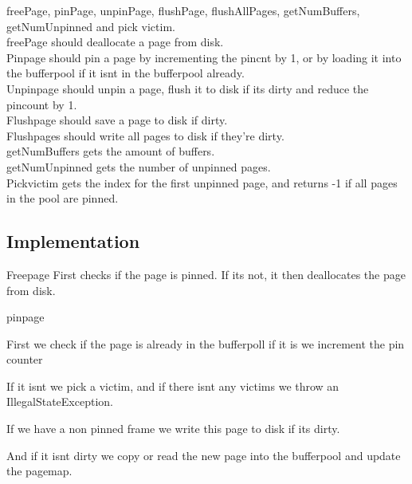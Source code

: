 \documentclass[a4paper,10pt,titlepage]{report}
\begin{document}
freePage, pinPage, unpinPage, flushPage, flushAllPages, getNumBuffers, getNumUnpinned and pick victim. \\

freePage should deallocate a page from disk.\\

Pinpage should pin a page by incrementing the pincnt by 1, or by loading it into the bufferpool if it isnt in the bufferpool already.\\

Unpinpage should unpin a page, flush it to disk if its dirty and reduce the pincount by 1.\\

Flushpage should save a page to disk if dirty.\\

Flushpages should write all pages to disk if they're dirty.\\

getNumBuffers gets the amount of buffers.\\

getNumUnpinned gets the number of unpinned pages.\\

Pickvictim gets the index for the first unpinned page, and returns -1 if all pages in the pool are pinned.

%

\subsection{Implementation}
Freepage First checks if the page is pinned. If its not, it then deallocates the page from disk.

\vspace{10mm}



pinpage

First we check if the page is already in the bufferpoll if it is we increment the pin counter

If it isnt we pick a victim, and if there isnt any victims we throw an IllegalStateException.

If we have a non pinned frame we write this page to disk if its dirty.

And if it isnt dirty we  copy or read the new page into the bufferpool and update the pagemap.

\vspace{10mm}
\end{document}
